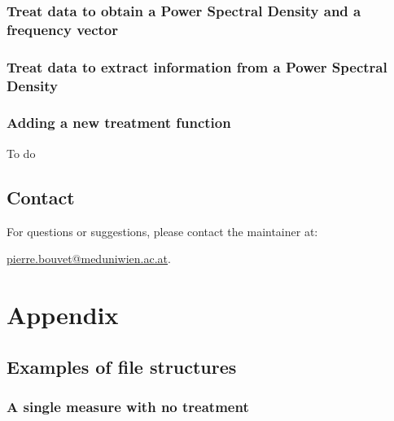 \documentclass{book}
\begin{document}
        \section{Treat data to obtain a Power Spectral Density and a frequency vector} \label{subsec:treatment.toPSD}
            

        \section{Treat data to extract information from a Power Spectral Density} \label{subsec:treatment.toInfo}
            

        \section{Adding a new treatment function} \label{subsec:treatment.new}
            \begin{tcolorbox}
                To do
            \end{tcolorbox}


    \chapter*{Contact}
        For questions or suggestions, please contact the maintainer at:
        \begin{center}
            \href{mailto:pierre.bouvet@meduniwien.ac.at}{pierre.bouvet@meduniwien.ac.at}.
        \end{center}




\appendix

\part*{Appendix}

\chapter{Examples of file structures} \label{chap:examples_file_structures}
    \section{A single measure with no treatment}
        
    
\end{document}
